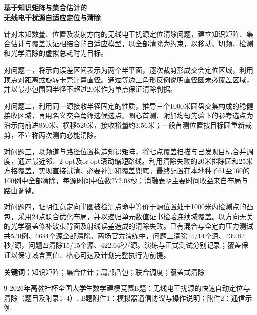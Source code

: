 \documentclass[a4paper,12pt]{article}
\theoremstyle{definition}
\begin{document}
\begin{center}
{\LARGE\bfseries 基于知识矩阵与集合估计的\\[0.25em]无线电干扰源自适应定位与清除}\par
\vspace{1em}{\large\bfseries 摘要}
\end{center}
针对未知数量、位置及发射方向的无线电干扰源定位清除问题，建立知识矩阵、集合估计与覆盖认证相结合的自适应模型，以全部清除为约束，以移动、切频、检测和光学清除的虚拟总耗时为目标。

对问题一，将示向误差区间表示为两个半平面，逐次裁剪形成交会定位区域，利用顶点对距离或旋转卡壳计算直径。通过等边三角形反例说明直径圆未必覆盖区域，并以最小包围圆半径不超过20米作为单点保证清除判据。

对问题二，利用同一源接收半径固定的性质，推导三个1000米圆盘交集构成的稳健接收区域，再用名义交会角筛选候选点。圆心首测、附加均匀先验下的参考选点为沿示向前进850米、横移520米，接收裕量约3.56米；一般首测位置按目标圆重新裁剪，不宣称两次测向必能清除。

对问题三，以频道与路径位置构造知识矩阵，将七点覆盖扫描与已发现目标合并调度，通过最近邻、2-opt及or-opt滚动缩短路线。利用清除失败的20米排除圆和25米方格覆盖，实现直接试清、必要补测和覆盖兜底。最终配置在本地种子61至160的100例中全部清除，每源时间中位数272.08秒；消融表明主要时间收益来自布局与路由调整。

对问题四，证明任意定向半圆被检测点命中等价于源位置处于1000米内检测点的凸包，采用24点联合优化布局，并以递归单元数值证书检验连续域覆盖。以方向无关的光学覆盖修补波束背面及射线误差造成的清除失败。已有混合与全定向压力测试共520例、6684个源全部清除。两场官方演练中，问题三清除14/14个源、239.82秒/源，问题四清除15/15个源、422.64秒/源。演练与正式测试分别记录；覆盖保证以保守域含真值、格心可达及计划完整执行为前提。

\noindent\textbf{关键词：}知识矩阵；集合估计；局部凸包；联合调度；覆盖式清除
\clearpage






\begin{thebibliography}{9}
 2026年高教社杯全国大学生数学建模竞赛B题：无线电干扰源的快速自动定位与清除（题目及附录1--4）.
 B题附件1：模拟器通信协议与操作说明；附件2：通信示例.
\end{thebibliography}
\clearpage\appendix



\end{document}
